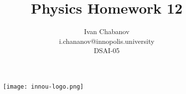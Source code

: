 \begin{titlepage}

    \begin{figure}[t]
        \centering
        \texttt{[image: innou-logo.png]} %
    \end{figure}
    
    \title{Physics Homework 12}
    \author{Ivan Chabanov\\i.chananov@innopolis.university\\DSAI-05}

    \maketitle

\end{titlepage}